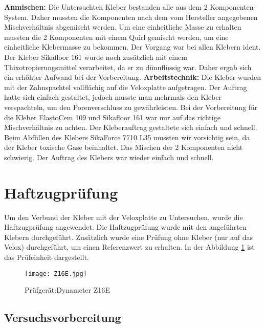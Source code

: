 \documentclass[12 pt,a4 paper ]{scrreprt}
\begin{document}
\textbf{ Anmischen:}
 Die Untersuchten Kleber bestanden alle aus dem 2 Komponenten-System. Daher mussten die Komponenten nach dem vom Hersteller  angegebenen Mischverhältnis abgemischt werden. Um eine einheitliche Masse zu erhalten mussten die 2 Komponenten mit einem Quirl gemischt werden, um eine einheitliche Klebermasse zu bekommen. Der Vorgang war bei allen Klebern ident. Der Kleber Sikafloor 161 wurde noch zusätzlich mit einem Thixotropierungsmittel verarbeitet, da er zu dünnflüssig war. Daher ergab sich ein erhöhter Aufwand bei der Vorbereitung.
\newline{}
\textbf{ Arbeitstechnik:}
Die Kleber wurden mit der Zahnspachtel vollflächig auf die Veloxplatte aufgetragen. 
Der Auftrag hatte sich einfach gestaltet, jedoch musste man mehrmals den Kleber verspachteln, um den Porenverschluss zu gewährleisten.
Bei der Vorbereitung für die Kleber ElastoCem 109 und Sikafloor 161 war nur auf das richtige Mischverhältnis zu achten. Der Kleberauftrag gestaltete sich einfach und schnell.
Beim Abfüllen des Klebers SikaForce 7710 L35 mussten wir vorsichtig sein, da der Kleber toxische Gase beinhaltet. Das Mischen der 2 Komponenten nicht schwierig. Der Auftrag des Klebers war wieder einfach und schnell.

\section{Haftzugprüfung}
Um den Verbund der Kleber mit der Veloxplatte zu Untersuchen, wurde die Haftzugprüfung angewendet.
Die Haftzugprüfung  wurde mit den angeführten Klebern durchgeführt. Zusätzlich wurde eine Prüfung ohne Kleber (nur auf das Velox) durchgeführt, um einen Referenzwert zu erhalten. In der Abbildung \ref{Z16E} ist das Prüfeinheit dargestellt.

\begin{figure}
\begin{center}
\texttt{[image: Z16E.jpg]}
\caption{ Prüfgerät:Dynameter Z16E}
\label{Z16E}
\end{center}
\end{figure}

\newpage{}

\subsection{Versuchsvorbereitung}
\end{document}
